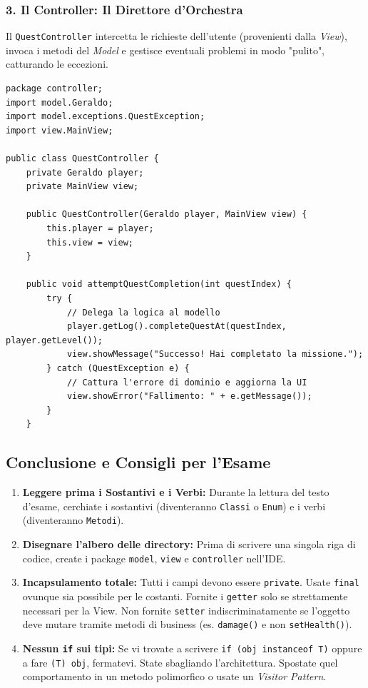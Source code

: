 \documentclass[12pt, a4paper]{article}
\begin{document}
\subsubsection{3. Il Controller: Il Direttore d'Orchestra}
Il \texttt{QuestController} intercetta le richieste dell'utente (provenienti dalla \textit{View}), invoca i metodi del \textit{Model} e gestisce eventuali problemi in modo "pulito", catturando le eccezioni.
\begin{verbatim}
package controller;
import model.Geraldo;
import model.exceptions.QuestException;
import view.MainView;

public class QuestController {
    private Geraldo player;
    private MainView view;

    public QuestController(Geraldo player, MainView view) {
        this.player = player;
        this.view = view;
    }

    public void attemptQuestCompletion(int questIndex) {
        try {
            // Delega la logica al modello
            player.getLog().completeQuestAt(questIndex, player.getLevel());
            view.showMessage("Successo! Hai completato la missione.");
        } catch (QuestException e) {
            // Cattura l'errore di dominio e aggiorna la UI
            view.showError("Fallimento: " + e.getMessage());
        }
    }
\end{verbatim}

\subsection{Conclusione e Consigli per l'Esame}
\begin{enumerate}
    \item \textbf{Leggere prima i Sostantivi e i Verbi:} Durante la lettura del testo d'esame, cerchiate i sostantivi (diventeranno \texttt{Classi} o \texttt{Enum}) e i verbi (diventeranno \texttt{Metodi}).
    \item \textbf{Disegnare l'albero delle directory:} Prima di scrivere una singola riga di codice, create i package \texttt{model}, \texttt{view} e \texttt{controller} nell'IDE.
    \item \textbf{Incapsulamento totale:} Tutti i campi devono essere \texttt{private}. Usate \texttt{final} ovunque sia possibile per le costanti. Fornite i \texttt{getter} solo se strettamente necessari per la View. Non fornite \texttt{setter} indiscriminatamente se l'oggetto deve mutare tramite metodi di business (es. \texttt{damage()} e non \texttt{setHealth()}).
    \item \textbf{Nessun \texttt{if} sui tipi:} Se vi trovate a scrivere \texttt{if (obj instanceof T)} oppure a fare \texttt{(T) obj}, fermatevi. State sbagliando l'architettura. Spostate quel comportamento in un metodo polimorfico o usate un \textit{Visitor Pattern}.
\end{enumerate}
\end{document}
